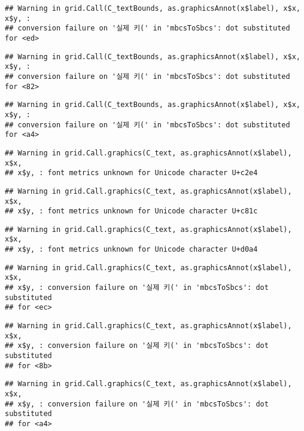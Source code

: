 \documentclass[]{book}
\begin{document}
\begin{verbatim}
## Warning in grid.Call(C_textBounds, as.graphicsAnnot(x$label), x$x, x$y, :
## conversion failure on '실제 키(' in 'mbcsToSbcs': dot substituted for <ed>
\end{verbatim}

\begin{verbatim}
## Warning in grid.Call(C_textBounds, as.graphicsAnnot(x$label), x$x, x$y, :
## conversion failure on '실제 키(' in 'mbcsToSbcs': dot substituted for <82>
\end{verbatim}

\begin{verbatim}
## Warning in grid.Call(C_textBounds, as.graphicsAnnot(x$label), x$x, x$y, :
## conversion failure on '실제 키(' in 'mbcsToSbcs': dot substituted for <a4>
\end{verbatim}

\begin{verbatim}
## Warning in grid.Call.graphics(C_text, as.graphicsAnnot(x$label), x$x,
## x$y, : font metrics unknown for Unicode character U+c2e4
\end{verbatim}

\begin{verbatim}
## Warning in grid.Call.graphics(C_text, as.graphicsAnnot(x$label), x$x,
## x$y, : font metrics unknown for Unicode character U+c81c
\end{verbatim}

\begin{verbatim}
## Warning in grid.Call.graphics(C_text, as.graphicsAnnot(x$label), x$x,
## x$y, : font metrics unknown for Unicode character U+d0a4
\end{verbatim}

\begin{verbatim}
## Warning in grid.Call.graphics(C_text, as.graphicsAnnot(x$label), x$x,
## x$y, : conversion failure on '실제 키(' in 'mbcsToSbcs': dot substituted
## for <ec>
\end{verbatim}

\begin{verbatim}
## Warning in grid.Call.graphics(C_text, as.graphicsAnnot(x$label), x$x,
## x$y, : conversion failure on '실제 키(' in 'mbcsToSbcs': dot substituted
## for <8b>
\end{verbatim}

\begin{verbatim}
## Warning in grid.Call.graphics(C_text, as.graphicsAnnot(x$label), x$x,
## x$y, : conversion failure on '실제 키(' in 'mbcsToSbcs': dot substituted
## for <a4>
\end{verbatim}
\end{document}
